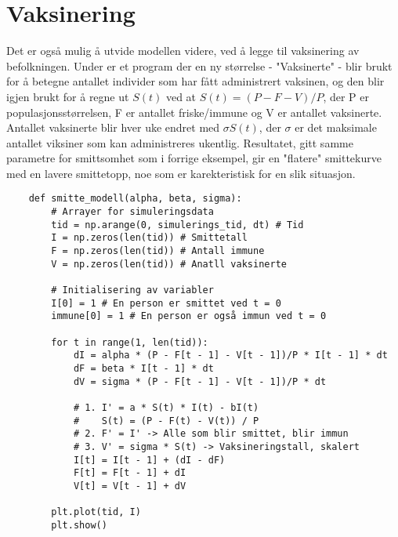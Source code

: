 \documentclass[12pt]{article}
\begin{document}
\newpage
\section{Vaksinering}
Det er også mulig å utvide modellen videre, ved å legge til vaksinering av befolkningen. Under er et program 
der en ny størrelse - "Vaksinerte" - blir brukt for å betegne antallet individer som har fått administrert vaksinen, 
og den blir igjen brukt for å regne ut $S(t)$ ved at $S(t) = (P - F - V) / P$, der P er populasjonsstørrelsen, F er 
antallet friske/immune og V er antallet vaksinerte. Antallet vaksinerte blir hver uke endret med $\sigma S(t)$, der 
$\sigma$ er det maksimale antallet viksiner som kan administreres ukentlig. Resultatet, gitt samme parametre for 
smittsomhet som i forrige eksempel, gir en "flatere" smittekurve med en lavere smittetopp, noe som er karekteristisk 
for en slik situasjon. 

\begin{Codesnippet}
    \begin{verbatim}
    def smitte_modell(alpha, beta, sigma):
        # Arrayer for simuleringsdata
        tid = np.arange(0, simulerings_tid, dt) # Tid
        I = np.zeros(len(tid)) # Smittetall
        F = np.zeros(len(tid)) # Antall immune
        V = np.zeros(len(tid)) # Anatll vaksinerte

        # Initialisering av variabler
        I[0] = 1 # En person er smittet ved t = 0
        immune[0] = 1 # En person er også immun ved t = 0

        for t in range(1, len(tid)):
            dI = alpha * (P - F[t - 1] - V[t - 1])/P * I[t - 1] * dt
            dF = beta * I[t - 1] * dt
            dV = sigma * (P - F[t - 1] - V[t - 1])/P * dt

            # 1. I' = a * S(t) * I(t) - bI(t)
            #    S(t) = (P - F(t) - V(t)) / P
            # 2. F' = I' -> Alle som blir smittet, blir immun
            # 3. V' = sigma * S(t) -> Vaksineringstall, skalert
            I[t] = I[t - 1] + (dI - dF)
            F[t] = F[t - 1] + dI
            V[t] = V[t - 1] + dV

        plt.plot(tid, I)
        plt.show()
    \end{verbatim}
\end{Codesnippet}
\end{document}
